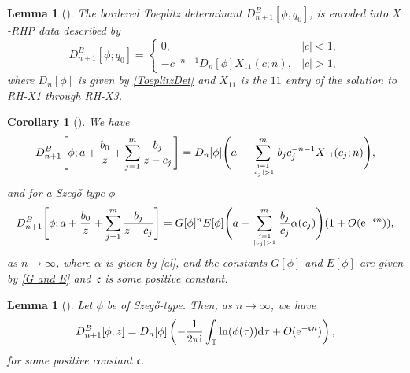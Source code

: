 \documentclass[pdftex]{sigma}
\numberwithin{equation}{section}
\newtheorem{Corollary}[Theorem]{Corollary}
\newtheorem{Lemma}[Theorem]{Lemma}
 { \theoremstyle{definition}
\newtheorem{Definition}[Theorem]{Definition}
\newtheorem{Example}[Theorem]{Example}
\newtheorem{Remark}[Theorem]{Remark}
\newtheorem{Question}[Theorem]{Question}
}
\newcommand{\T}{{\mathbb T}}
\newcommand{\al}{\alpha}
\newcommand{\di}{\displaystyle}
\newcommand{\ii}{{\rm i}}
\newcommand{\dd}{{\rm d}}
\begin{document}
	\begin{Lemma}[\cite{BEGIL}]\label{lemma 3.2}
		The bordered Toeplitz determinant $D^B_{n+1}[\phi,q_0]$, is encoded into $X$-RHP data described by
		\begin{equation}\label{psi=1/z-c 0}
			D^B_{n+1}[\phi;q_0] = \begin{cases}
				0, & |c|<1, \\
				-c^{-n-1}D_{n}[\phi]X_{11}(c;n), & |c|>1,
			\end{cases}
		\end{equation}
		where $D_{n}[\phi]$ is given by \eqref{ToeplitzDet} and $X_{11}$ is the $11$ entry of the solution to {\rm RH-X1} through {\rm RH-X3}.
	\end{Lemma}
	\begin{Corollary}[\cite{BEGIL}]\label{cor 1}
		We have
		\begin{gather*}%
			D^B_{n+1}\Bigg[\phi;\di a+\frac{b_0}{z}+\sum^{m}_{j=1}\frac{b_j }{z-c_j}\Bigg] = D_n[\phi] \Bigg(a -\sum^{m}_{j=1 \atop |c_j|>1 }b_j c^{-n-1}_jX_{11}(c_j;n)\Bigg),
		\end{gather*}
		and for a Szeg\H{o}-type $\phi$
		\begin{gather*}%
			D^B_{n+1}\Bigg[\phi;\di a+\frac{b_0}{z}+\sum^{m}_{j=1}\frac{b_j }{z-c_j}\Bigg] = G[\phi]^{n} E[\phi] \Bigg(a -\sum^{m}_{j=1 \atop |c_j|>1 }\frac{b_j}{c_j} \al(c_j)\Bigg)( 1 + O({\rm e}^{-\mathfrak{c}n})),
		\end{gather*}
		as $n \to \infty$, where $\al$ is given by \eqref{al}, and the constants $G[\phi]$ and $E[\phi]$ are given by \eqref{G and E} and~$\mathfrak{c}$ is some positive constant.
	\end{Corollary}
	
	\begin{Lemma}[\cite{BEGIL}]\label{psi=z}
		Let $\phi$ be of Szeg\H{o}-type. Then, as $n \to \infty$, we have
		\begin{gather*}%
			D^B_{n+1}[\phi;z] = D_n[\phi] \left(-\frac{1}{2\pi \ii} \int_{\T} \ln(\phi(\tau)) \dd \tau + O({\rm e}^{-\mathfrak{c}n})\right),
		\end{gather*}
		for some positive constant $\mathfrak{c}$.
	\end{Lemma}
	
\end{document}
